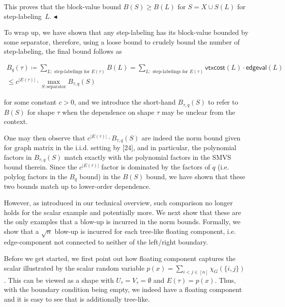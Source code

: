 This proves that the block-value bound $B(S)\geq B(L)$ for $S=X\cup S(L)$ for step-labeling $L$. $\blacktriangleleft$\par




To wrap up, we have shown that any step-labeling has its block-value bounded by some separator, therefore, using a loose bound to crudely bound the number of step-labeling, the final bound follows as\par


\[\begin{gathered}
\displaystyle B_{q}(\tau)\coloneqq\sum_{L:\text{ step-labelings for }E(\tau)}B(L)= \displaystyle\sum_{L:\text{ step-labelings for }E(\tau)}\mathsf{vtxcost}(L)\cdot\mathsf{edgeval}(L) \\
\displaystyle\leq c^{|E(\tau)|}\cdot\max_{S:\text{separator}}B_{\tau,q}(S)
\end{gathered}\]


for some constant $c>0$, and we introduce the short-hand $B_{\tau,q}(S)$ to refer to $B(S)$ for shape $\tau$ when the dependence on shape $\tau$ may be unclear from the context.\par




One may then observe that $c^{|E(\tau)|}\cdot B_{\tau,q}(S)$ are indeed the norm bound given for graph matrix in the i.i.d. setting by [24], and in particular, the polynomial factors in $B_{\tau,q}(S)$ match exactly with the polynomial factors in the SMVS bound therein. Since the $c^{|E(\tau)|}$ factor is dominated by the factors of $q$ (i.e. polylog factors in the $B_{q}$ bound) in the $B(S)$ bound, we have shown that these two bounds match up to lower-order dependence.\par




However, as introduced in our technical overview, such comparison no longer holds for the scalar example and potentially more. We next show that these are the only examples that a blow-up is incurred in the norm bounds. Formally, we show that a $\sqrt{n}$ blow-up is incurred for each tree-like floating component, i.e. edge-component not connected to neither of the left/right boundary.\par




Before we get started, we first point out how floating component captures the scalar illustrated by the scalar random variable $p(x)=\sum_{i<j\in[n]}\chi_{G}(\{i,j\})$ . This can be viewed as a shape with $U_{\tau}=V_{\tau}=\emptyset$ and $E(\tau)=p(x)$. Thus, with the boundary condition being empty, we indeed have a floating component and it is easy to see that is additionally tree-like.\par




